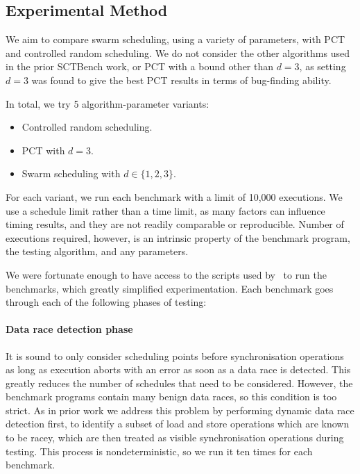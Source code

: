 \subsection{Experimental Method}
\label{sec:algorithms-bench-method}

We aim to compare swarm scheduling, using a variety of parameters, with PCT and
controlled random scheduling.  We do not consider the other algorithms used in
the prior SCTBench work, or PCT with a bound other than $d=3$, as setting $d=3$ was
found to give the best PCT results in terms of bug-finding ability\cite{thomson2016}.

In total, we try 5 algorithm-parameter variants:

\begin{itemize}
\item Controlled random scheduling.
\item PCT with $d=3$.
\item Swarm scheduling with $d \in \{1,2,3\}$.
\end{itemize}

For each variant, we run each benchmark with a limit of 10,000
executions.  We use a schedule limit rather than a time limit, as many
factors can influence timing results, and they are not readily
comparable or reproducible.  Number of executions required, however,
is an intrinsic property of the benchmark program, the testing
algorithm, and any parameters.

We were fortunate enough to have access to the scripts used
by~\cite{thomson2016,thomson2014} to run the benchmarks, which greatly
simplified experimentation.  Each benchmark goes through each of the
following phases of testing:

\paragraph{Data race detection phase}
It is sound to only consider scheduling points before synchronisation operations
as long as execution aborts with an error as soon as a data race is
detected\cite{musuvathi2008}.  This greatly reduces the number of schedules that
need to be considered.  However, the benchmark programs contain many benign data
races\cite{thomson2016}, so this condition is too strict.  As in prior
work\cite{thomson2016,thomson2014,yu2012} we address this problem by performing
dynamic data race detection first, to identify a subset of load and store
operations which are known to be racey, which are then treated as visible
synchronisation operations during testing.  This process is nondeterministic, so
we run it ten times for each benchmark.

